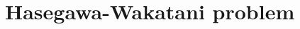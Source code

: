 \documentclass[12pt,lot, lof]{puthesis}
\begin{document}
%		
%		
%		
%
%
%


\chapter{Hasegawa-Wakatani problem}
\label{haswak}
\end{document}
